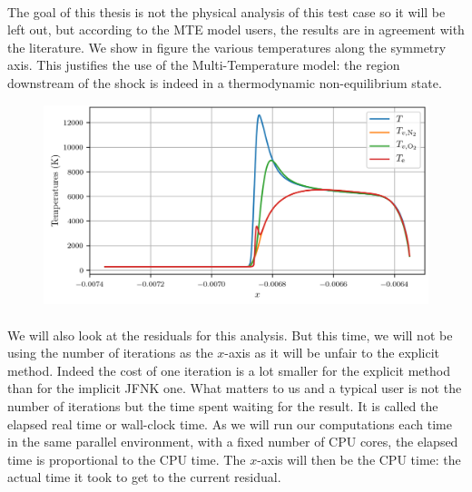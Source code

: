         \paragraph{}
        The goal of this thesis is not the physical analysis of this test case so it will be left out, but according to the MTE model users, the results are in agreement with the literature.
        We show in figure  the various temperatures along the symmetry axis.
        This justifies the use of the Multi-Temperature model: the region downstream of the shock is indeed in a thermodynamic non-equilibrium state.

        \begin{figure}
          \centering
          \includegraphics{figures/sphere_mte_temperatures.png}
          \caption{}
          \label{fig:sphere_mte_temperatures}
        \end{figure}

        \paragraph{}
        We will also look at the residuals for this analysis.
        But this time, we will not be using the number of iterations as the $x$-axis as it will be unfair to the explicit method.
        Indeed the cost of one iteration is a lot smaller for the explicit method than for the implicit JFNK one.
        What matters to us and a typical user is not the number of iterations but the time spent waiting for the result.
        It is called the elapsed real time or wall-clock time.
        As we will run our computations each time in the same parallel environment, with a fixed number of CPU cores, the elapsed time is proportional to the CPU time.
        The $x$-axis will then be the CPU time: the actual time it took to get to the current residual.

